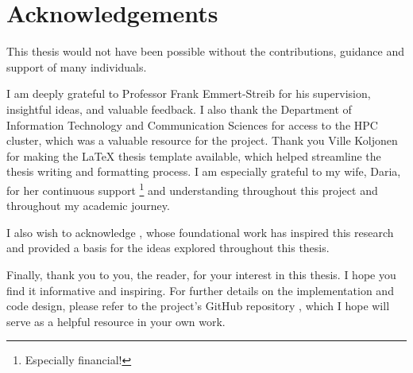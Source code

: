 \chapter*{Acknowledgements}

This thesis would not have been possible without the contributions, guidance and support of many individuals.

I am deeply grateful to Professor Frank Emmert-Streib for his supervision, insightful ideas, and valuable feedback. I also thank the Department of Information Technology and Communication Sciences for access to the HPC cluster, which was a valuable resource for the project.
Thank you Ville Koljonen for making the LaTeX thesis template available, which helped streamline the thesis writing and formatting process. I am especially grateful to my wife, Daria, for her continuous support \footnote{Especially financial!} and understanding throughout this project and throughout my academic journey.

I also wish to acknowledge \citeauthor{STraTS2022}, whose foundational work has inspired this research and provided a basis for the ideas explored throughout this thesis.

Finally, thank you to you, the reader, for your interest in this thesis. I hope you find it informative and inspiring. For further details on the implementation and code design, please refer to the project's GitHub repository , which I hope will serve as a helpful resource in your own work.


\clearpage

